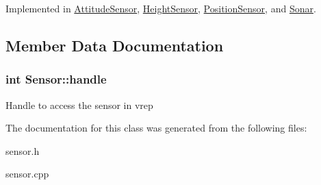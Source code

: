 Implemented in \hyperlink{classAttitudeSensor_a035c43c2ae16df0dedbbc7ae4cb575d9}{Attitude\+Sensor}, \hyperlink{classHeightSensor_a6966090886a414a6213125c91a31e128}{Height\+Sensor}, \hyperlink{classPositionSensor_a4fb083aa0462a73627b11b7c0e408f09}{Position\+Sensor}, and \hyperlink{classSonar_ab32f714b0c5412e64ec60997467074bc}{Sonar}.



\subsection{Member Data Documentation}
\subsubsection[{\texorpdfstring{handle}{handle}}]{\setlength{\rightskip}{0pt plus 5cm}int Sensor\+::handle\hspace{0.3cm}{\ttfamily [protected]}}\hypertarget{classSensor_ad31f2503e8a1cc7888e5eefbeede8f3b}{}\label{classSensor_ad31f2503e8a1cc7888e5eefbeede8f3b}
Handle to access the sensor in vrep 

The documentation for this class was generated from the following files\+:\begin{DoxyCompactItemize}
\item 
sensor.\+h\item 
sensor.\+cpp\end{DoxyCompactItemize}
